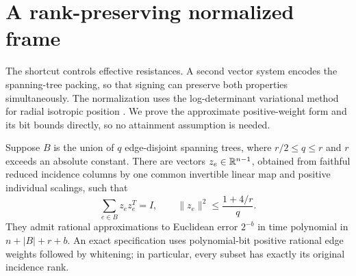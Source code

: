 \section{A rank-preserving normalized frame}
\label{sec:normalization}


The shortcut controls effective resistances. A second vector system
encodes the spanning-tree packing, so that signing can preserve both
properties simultaneously. The normalization uses the log-determinant
variational method for radial isotropic position
\cite[Section~2.2]{Barthe1998}. We prove the approximate positive-weight
form and its bit bounds directly, so no attainment assumption is needed.

\begin{lemma}
\label{lem:ta-frame}
Suppose $B$ is the union of $q$ edge-disjoint spanning trees, where
$r/2\le q\le r$ and $r$ exceeds an absolute constant. There are vectors
$z_e\in\mathbb R^{n-1}$, obtained from faithful reduced incidence columns by one
common invertible linear map and positive individual scalings, such that
\begin{equation}
 \sum_{e\in B}z_ez_e^T=I,\qquad
                  \|z_e\|^2\le\frac{1+4/r}{q}.
 \label{eq:ta-frame}
\end{equation}
They admit rational approximations to Euclidean error $2^{-b}$ in time
polynomial in $n+|B|+r+b$. An exact specification uses polynomial-bit
positive rational edge weights followed by whitening; in particular,
every subset has exactly its original incidence rank.
\end{lemma}

